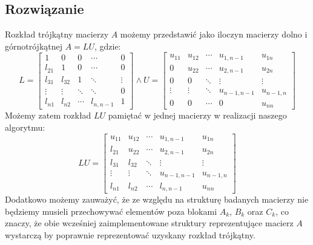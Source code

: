 \documentclass[11pt]{article}
\begin{document}
    \subsection*{Rozwiązanie}
        Rozkład trójkątny macierzy $A$ możemy przedstawić jako iloczyn macierzy dolno i górnotrójkątnej $A = LU$, gdzie:
        $$
        L =
        \begin{bmatrix}
            1      & 0      & 0      & \dotsb    & 0      \\
            l_{21} & 1      & 0      & \dotsb    & 0      \\
            l_{31} & l_{32} & 1      & \ddots    & \vdots \\
            \vdots & \vdots & \ddots & \ddots    & 0      \\
            l_{n1} & l_{n2} & \dotsb & l_{n,n-1} & 1
        \end{bmatrix}
        \land
        U =
        \begin{bmatrix}
            u_{11} & u_{12} & \dotsb & u_{1,n-1}   & u_{1n}    \\
            0      & u_{22} & \dotsb & u_{2,n-1}   & u_{2n}    \\
            0      & 0      & \ddots & \vdots      & \vdots    \\
            \vdots & \vdots & \ddots & u_{n-1,n-1} & u_{n-1,n} \\
            0      & 0      & \dotsb & 0           & u_{nn}
        \end{bmatrix}
        $$
        Możemy zatem rozkład $LU$ pamiętać w jednej macierzy w realizacji naszego algorytmu:
        $$
        LU =
        \begin{bmatrix}
            u_{11} & u_{12} & \dotsb & u_{1,n-1}   & u_{1n}    \\
            l_{21} & u_{22} & \dotsb & u_{2,n-1}   & u_{2n}    \\
            l_{31} & l_{32} & \ddots & \vdots      & \vdots    \\
            \vdots & \vdots & \ddots & u_{n-1,n-1} & u_{n-1,n} \\
            l_{n1} & l_{n2} & \dotsb & l_{n,n-1}   & u_{nn}
        \end{bmatrix}
        $$
        Dodatkowo możemy zauważyć, że ze względu na strukturę badanych macierzy nie będziemy musieli przechowywać elementów poza blokami $A_k$, $B_k$ oraz $C_k$, co znaczy, że obie wcześniej zaimplementowane struktury reprezentujące macierz $A$ wystarczą by poprawnie reprezentować uzyskany rozkład trójkątny.
\end{document}
